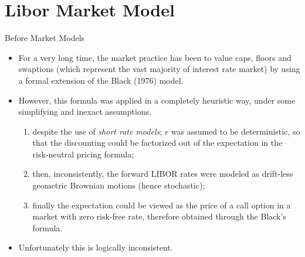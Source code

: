 \documentclass{beamer}
\begin{document}

\section{Libor Market Model}
\begin{frame}{Before Market Models}
  \begin{itemize}
  \item<1-> For a very long time, the market practice has been to value caps, floors and swaptions (which represent the vast majority of interest rate market) by using a formal extension of the Black (1976) model. 
  \item<2-> However, this formula was applied in a completely heuristic way, under some simplifying and inexact assumptions.
    \begin{enumerate}
    \item despite the use of \emph{short rate models}; $r$ was assumed to be deterministic, so that the discounting could be factorized out of the expectation in the risk-neutral pricing formula; 
    \item then, inconsistently, the forward LIBOR rates were modeled as drift-less geometric Brownian motions (hence stochastic);
    \item finally the expectation could be viewed as the price of a call option in a market with zero risk-free rate, therefore obtained through the Black’s formula.
    \end{enumerate} 
  \item<3-> Unfortunately this is logically inconsistent.
  \end{itemize}
\end{frame}
\end{document}
